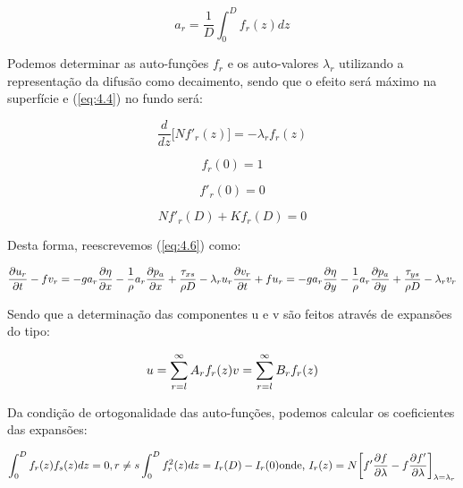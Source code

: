 \documentclass[11pt]{article}
\begin{document}
\begin{equation}
    a_r = \frac{1}{D}\int^{D}_{0}f_r(z)dz
    \label{eq:4.7}
\end{equation}

Podemos determinar as auto-funções \(f_r\) e os auto-valores
\(\lambda_r\) utilizando a representação da difusão como decaimento,
sendo que o efeito será máximo na superfície e (\ref{eq:4.4}) no fundo
será:

\begin{equation}
    \frac{d}{dz}\bigg[ Nf'_r(z) \bigg] = -\lambda_r f_r(z)
\end{equation}

\begin{equation}
    f_r(0) = 1
    \label{eq:4.8}
\end{equation}

\begin{equation}
    f'_r(0) = 0
    \label{eq:4.9}
\end{equation}

\begin{equation}
    N f'_r(D) + K f_r(D) = 0
    \label{eq:4.10}
\end{equation}

Desta forma, reescrevemos (\ref{eq:4.6}) como:

\begin{equation}
    \frac{\partial{u_r}}{\partial{t}} - fv_r = -ga_r\frac{\partial{\eta}}{\partial{x}} - \frac{1}{\rho}a_r\frac{\partial{p_a}}{\partial{x}} + \frac{\tau_{xs}}{\rho D} - \lambda_ru_r
    \\
    \frac{\partial{v_r}}{\partial{t}} + fu_r = -ga_r\frac{\partial{\eta}}{\partial{y}} - \frac{1}{\rho}a_r\frac{\partial{p_a}}{\partial{y}} + \frac{\tau_{ys}}{\rho D} - \lambda_rv_r
    \label{eq:4.11}
\end{equation}

Sendo que a determinação das componentes u e v são feitos através de
expansões do tipo:

\begin{equation}
    u = \sum^{\infty}_{r=l} A_rf_r(z)
    \\
    v = \sum^{\infty}_{r=l} B_rf_r(z)
    \label{eq:4.12}
\end{equation}

Da condição de ortogonalidade das auto-funções, podemos calcular os
coeficientes das expansões:

\begin{equation}
    \int^{D}_{0}f_r(z) f_s(z) dz = 0, r \neq s
    \\
    \int^{D}_{0}f^{2}_{r}(z) dz = I_r(D) - I_r(0)
    \\
    \text{onde, } I_r(z) = N\bigg[ f'\frac{\partial{f}}{\partial{\lambda}} - f\frac{\partial{f'}}{\partial{\lambda}} \bigg]_{\lambda=\lambda_r}
    \label{eq:4.13}
\end{equation}
\end{document}
